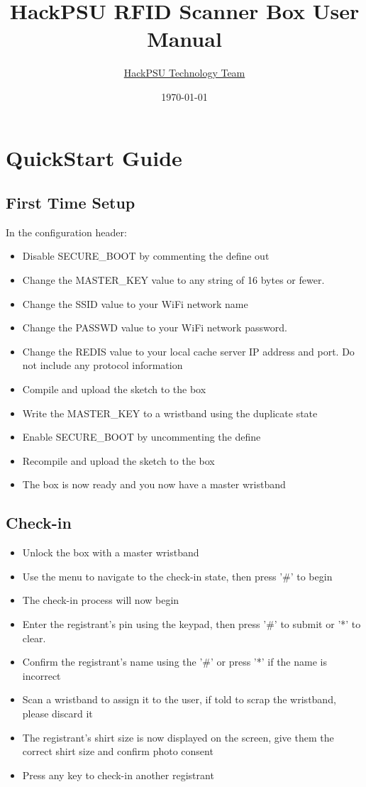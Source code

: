 \documentclass{article}
\title{HackPSU RFID Scanner Box User Manual}
\date{\today}
\author{ \href{mailto:technology@hackpsu.org}{HackPSU Technology Team}}
\begin{document}
\maketitle

\tableofcontents

\section{QuickStart Guide}
\subsection{First Time Setup}
In the configuration header:
\begin{itemize}
	\item Disable SECURE\_BOOT by commenting the define out
	\item Change the MASTER\_KEY value to any string of 16 bytes or fewer.
	\item Change the SSID value to your WiFi network name
	\item Change the PASSWD value to your WiFi network password.  
	\item Change the REDIS value to your local cache server IP address and port.  Do not include any protocol information
	\item Compile and upload the sketch to the box
	\item Write the MASTER\_KEY to a wristband using the duplicate state
	\item Enable SECURE\_BOOT by uncommenting the define
	\item Recompile and upload the sketch to the box
	\item The box is now ready and you now have a master wristband
\end{itemize}
\subsection{Check-in}
\begin{itemize}
	\item Unlock the box with a master wristband
	\item Use the menu to navigate to the check-in state, then press '\#' to begin
	\item The check-in process will now begin
	\item Enter the registrant's pin using the keypad, then press '\#' to submit or '*' to clear.
	\item Confirm the registrant's name using the '\#' or press '*' if the name is incorrect
	\item Scan a wristband to assign it to the user, if told to scrap the wristband, please discard it
	\item The registrant's shirt size is now displayed on the screen, give them the correct shirt size and confirm photo consent
	\item Press any key to check-in another registrant
\end{itemize}
\end{document}
